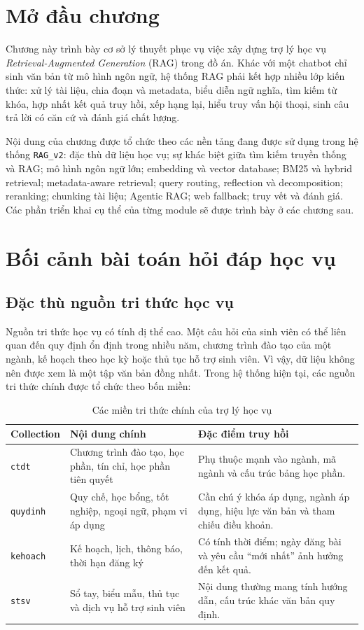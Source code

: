 \documentclass[../DoAn.tex]{subfiles}
\begin{document}
\section{Mở đầu chương}

Chương này trình bày cơ sở lý thuyết phục vụ việc xây dựng trợ lý học vụ
\textit{Retrieval-Augmented Generation} (RAG) trong đồ án. Khác với một chatbot
chỉ sinh văn bản từ mô hình ngôn ngữ, hệ thống RAG phải kết hợp nhiều lớp kiến
thức: xử lý tài liệu, chia đoạn và metadata, biểu diễn ngữ nghĩa, tìm kiếm từ
khóa, hợp nhất kết quả truy hồi, xếp hạng lại, hiểu truy vấn hội thoại, sinh câu
trả lời có căn cứ và đánh giá chất lượng.

Nội dung của chương được tổ chức theo các nền tảng đang được sử dụng trong hệ
thống \texttt{RAG\_v2}: đặc thù dữ liệu học vụ; sự khác biệt giữa tìm kiếm truyền
thống và RAG; mô hình ngôn ngữ lớn; embedding và vector database; BM25 và hybrid
retrieval; metadata-aware retrieval; query routing, reflection và decomposition;
reranking; chunking tài liệu; Agentic RAG; web fallback; truy vết và đánh giá.
Các phần triển khai cụ thể của từng module sẽ được trình bày ở các chương sau.

\section{Bối cảnh bài toán hỏi đáp học vụ}

\subsection{Đặc thù nguồn tri thức học vụ}

Nguồn tri thức học vụ có tính dị thể cao. Một câu hỏi của sinh viên có thể liên
quan đến quy định ổn định trong nhiều năm, chương trình đào tạo của một ngành,
kế hoạch theo học kỳ hoặc thủ tục hỗ trợ sinh viên. Vì vậy, dữ liệu không nên
được xem là một tập văn bản đồng nhất. Trong hệ thống hiện tại, các nguồn tri
thức chính được tổ chức theo bốn miền:

\begin{table}[h]
\centering
\begin{tabular}{|l|p{4.2cm}|p{6.3cm}|}
\hline
\textbf{Collection} & \textbf{Nội dung chính} & \textbf{Đặc điểm truy hồi} \\
\hline
\texttt{ctdt} & Chương trình đào tạo, học phần, tín chỉ, học phần tiên quyết &
Phụ thuộc mạnh vào ngành, mã ngành và cấu trúc bảng học phần. \\
\hline
\texttt{quydinh} & Quy chế, học bổng, tốt nghiệp, ngoại ngữ, phạm vi áp dụng &
Cần chú ý khóa áp dụng, ngành áp dụng, hiệu lực văn bản và tham chiếu điều khoản. \\
\hline
\texttt{kehoach} & Kế hoạch, lịch, thông báo, thời hạn đăng ký &
Có tính thời điểm; ngày đăng bài và yêu cầu ``mới nhất'' ảnh hưởng đến kết quả. \\
\hline
\texttt{stsv} & Sổ tay, biểu mẫu, thủ tục và dịch vụ hỗ trợ sinh viên &
Nội dung thường mang tính hướng dẫn, cấu trúc khác văn bản quy định. \\
\hline
\end{tabular}
\caption{Các miền tri thức chính của trợ lý học vụ}
\end{table}
\end{document}
